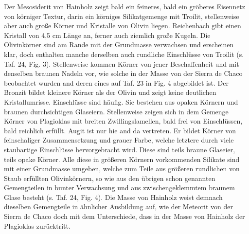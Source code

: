 \documentclass[a4paper, 12pt, oneside]{article}
\begin{document}
Der Mesosiderit von Hainholz zeigt bald ein feineres, bald ein gröberes Eisennetz von körniger Textur, darin ein körniges Silikatgemenge mit Troilit, stellenweise aber auch große Körner und Kristalle von Olivin liegen. Reichenbach gibt einen Kristall von 4,5 cm Länge an, ferner auch ziemlich große Kugeln. Die Olivinkörner sind am Rande mit der Grundmasse verwachsen und erscheinen klar, doch enthalten manche derselben auch rundliche Einschlüsse von Troilit (s. Taf. 24, Fig. 3). Stellenweise kommen Körner von jener Beschaffenheit und mit denselben braunen Nadeln vor, wie solche in der Masse von der Sierra de Chaco beobachtet wurden and deren eines auf Taf. 23 in Fig. 4 abgebildet ist. Der Bronzit bildet kleinere Körner als der Olivin und zeigt keine deutlichen Kristallumrisse. Einschlüsse sind häufig. Sie bestehen aus opaken Körnern und braunen durchsichtigen Glaseiern. Stellenweise zeigen sich in dem Gemenge Körner von Plagioklas mit breiten Zwillingslamellen, bald frei von Einschlüssen, bald reichlich erfüllt. Augit ist nur hie and da vertreten. Er bildet Körner von feinschaliger Zusammensetzung und grauer Farbe, welche letztere durch viele staubartige Einschlüsse hervorgebracht wird. Diese sind teils braune Glaseier, teils opake Körner. Alle diese in größeren Körnern vorkommenden Silikate sind mit einer Grundmasse umgeben, welche zum Teile aus größeren rundlichen von Staub erfüllten Olivinkörnern, so wie aus den übrigen schon genannten Gemengteilen in bunter Verwachsung und aus zwischengeklemmtem braunem Glase besteht (s. Taf. 24, Fig. 4). Die Masse von Hainholz weist demnach dieselben Gemengteile in ähnlicher Ausbildung auf, wie der Meteorit von der Sierra de Chaco doch mit dem Unterschiede, dass in der Masse von Hainholz der Plagioklas zurücktritt.
\end{document}
